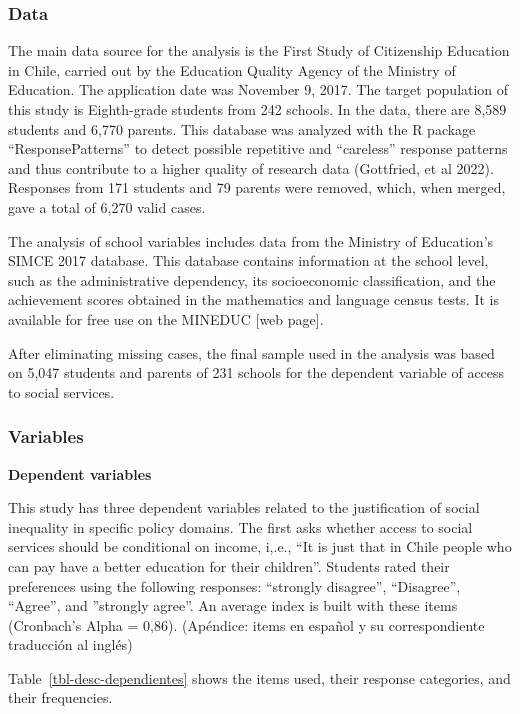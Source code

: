 \documentclass[
  letterpaper,
  DIV=11,
  numbers=noendperiod]{scrartcl}
\begin{document}
\subsubsection{Data}\label{data}

The main data source for the analysis is the First Study of Citizenship
Education in Chile, carried out by the Education Quality Agency of the
Ministry of Education. The application date was November 9, 2017. The
target population of this study is Eighth-grade students from 242
schools. In the data, there are 8,589 students and 6,770 parents. This
database was analyzed with the R package ``ResponsePatterns'' to detect
possible repetitive and ``careless'' response patterns and thus
contribute to a higher quality of research data (Gottfried, et al 2022).
Responses from 171 students and 79 parents were removed, which, when
merged, gave a total of 6,270 valid cases.

The analysis of school variables includes data from the Ministry of
Education's SIMCE 2017 database. This database contains information at
the school level, such as the administrative dependency, its
socioeconomic classification, and the achievement scores obtained in the
mathematics and language census tests. It is available for free use on
the MINEDUC {[}web page{]}.

After eliminating missing cases, the final sample used in the analysis
was based on 5,047 students and parents of 231 schools for the dependent
variable of access to social services.

\subsubsection{Variables}\label{variables}

\textbf{Dependent variables}

This study has three dependent variables related to the justification of
social inequality in specific policy domains. The first asks whether
access to social services should be conditional on income, i,.e., ``It
is just that in Chile people who can pay have a better education for
their children''. Students rated their preferences using the following
responses: ``strongly disagree'', ``Disagree'', ``Agree'', and
''strongly agree''. An average index is built with these items
(Cronbach's Alpha = 0,86). (Apéndice: items en español y su
correspondiente traducción al inglés)

Table~\ref{tbl-desc-dependientes} shows the items used, their response
categories, and their frequencies.
\end{document}

